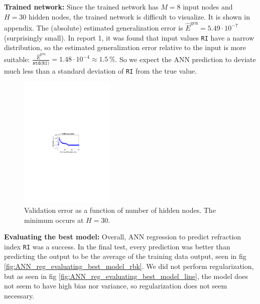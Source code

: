 \begin{multicols}{2}
\textbf{Trained network:} Since the trained network has $M = 8$ input nodes and $H=30$ hidden nodes, the trained network is difficult to visualize. It is shown in appendix. The (absolute) estimated generalization error is $\hat{E}^{\text{gen}} = 5.49 \cdot 10^{-7}$ (surprisingly small). In report 1, it was found that input values \texttt{RI} have a narrow distribution, so the estimated generalization error relative to the input is more suitable: $\frac{\hat{E}^{\text{gen}}}{\texttt{std(RI)}} = 1.48 \cdot 10^{-4} \approx 1.5 \, \%$. So we expect the ANN prediction to deviate much less than a standard deviation of \texttt{RI} from the true value.

\begin{figure}[H]
    \centering
    \includegraphics[width=0.40\textwidth]{fig/regression/ANN_reg_validation_error_nmax_30.pdf}
    \caption{Validation error as a function of number of hidden nodes. The minimum occurs at $H=30$.}
    \label{fig:ANN_reg_validation_error_nmax_30}
\end{figure}
\end{multicols}

\textbf{Evaluating the best model:} Overall, ANN regression to predict refraction index \texttt{RI} was a success. In the final test, every prediction was better than predicting the output to be the average of the training data output, seen in fig \ref{fig:ANN_reg_evaluating_best_model_rbk}. We did not perform regularization, but as seen in fig \ref{fig:ANN_reg_evaluating_best_model_line}, the model does not seem to have high bias nor variance, so regularization does not seem necessary.


